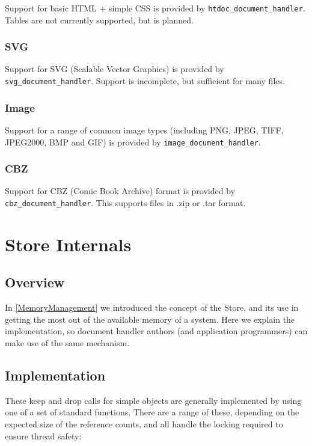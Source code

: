 \documentclass[oneside]{book}
\newcommand{\rjwref}[1] {\autoref{#1} \nameref{#1}}
\begin{document}
Support for basic HTML + simple CSS is provided by \texttt{htdoc\_document\_handler}. Tables are not currently supported, but is planned.

\subsection{SVG}

Support for SVG (Scalable Vector Graphics) is provided by \texttt{svg\_document\_handler}. Support is incomplete, but sufficient for many files.

\subsection{Image}

Support for a range of common image types (including PNG, JPEG, TIFF, JPEG2000, BMP and GIF) is provided by \texttt{image\_document\_handler}.

\subsection{CBZ}

Support for CBZ (Comic Book Archive) format is provided by \texttt{cbz\_document\_handler}. This supports files in .zip or .tar format.

\chapter{Store Internals}
\label{StoreInternals}

\section{Overview}

In \rjwref{MemoryManagement} we introduced the concept of the Store, and its use in getting the most out of the available memory of a system. Here we explain the implementation, so document handler authors (and application programmers) can make use of the same mechanism.

\section{Implementation}

These keep and drop calls for simple objects are generally implemented by using one of a set of standard functions. There are a range of these, depending on the expected size of the reference counts, and all handle the locking required to ensure thread safety:
\end{document}
